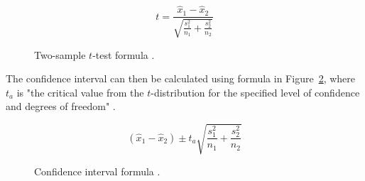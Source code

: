 \begin{figure}[H]
    \[ t = \displaystyle\frac{\hat{x}_1-\hat{x}_2}{\displaystyle\sqrt{\frac{s^2_1}{n_1}+\frac{s^2_2}{n_2}}} \]
    \caption{Two-sample $t$-test formula \parencite{sauro_chapter5_2016}.}
    \label{fig:hsie-two-sample-t-test}
\end{figure}

The confidence interval can then be calculated using formula in Figure~\ref{fig:hsie-confidence-interval-diff}, where $t_a$ is "the critical value from the $t$-distribution for the specified level of confidence and degrees of freedom" \parencite{sauro_chapter5_2016}.

\begin{figure}[H]
    \[ (\hat{x}_1-\hat{x}_2) \pm t_a\displaystyle\sqrt{\frac{s^2_1}{n_1}+\frac{s^2_2}{n_2}} \]
    \caption{Confidence interval formula \parencite{sauro_chapter5_2016}.}
    \label{fig:hsie-confidence-interval-diff}
\end{figure}
